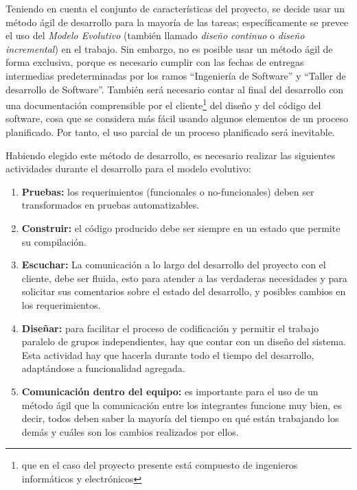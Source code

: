 \documentclass[letterpaper,spanish,10pt]{article}
\begin{document}

Teniendo en cuenta el conjunto de caracter\'isticas del proyecto, se
decide usar un m\'etodo \'agil de desarrollo para la
mayor\'ia de las tareas; espec\'ificamente se prevee el uso del \emph{Modelo
Evolutivo} (tambi\'en llamado \emph{dise\~no continuo} o \emph{dise\~no
incremental}) en el trabajo. Sin embargo, no es posible
usar un m\'etodo \'agil de forma exclusiva, porque es necesario cumplir con
las fechas de entregas intermedias predeterminadas por los ramos
``Ingenier\'ia de Software'' y ``Taller de desarrollo de Software''.
Tambi\'en ser\'a necesario contar al final del desarrollo con una
documentaci\'on comprensible por el cliente\footnote{que en el caso del
  proyecto presente est\'a compuesto de ingenieros inform\'aticos y
  electr\'onicos} del dise\~no y del c\'odigo del software, cosa que se
considera m\'as f\'acil usando algunos elementos de un proceso planificado.
Por
tanto, el uso parcial de un proceso planificado ser\'a inevitable.

Habiendo elegido este m\'etodo de desarrollo, es necesario realizar las
siguientes actividades durante el desarrollo para el modelo evolutivo:

\begin{enumerate}
\item \textbf{Pruebas:} los requerimientos (funcionales o no-funcionales) deben
  ser transformados en pruebas automatizables.
\item \textbf{Construir:} el c\'odigo producido debe ser siempre en un
  estado que permite su compilaci\'on.
\item \label{escuchar} \textbf{Escuchar:} La comunicaci\'on a lo largo del desarrollo del proyecto
con el cliente, debe ser fluida, esto para atender a las 
  verdaderas necesidades y para solicitar sus comentarios sobre el
  estado del desarrollo, y posibles cambios en los requerimientos.
\item \textbf{Dise\~nar:} para facilitar el proceso de codificaci\'on y permitir el
  trabajo paralelo de grupos independientes, hay que contar con un
  dise\~no del sistema.
  Esta actividad hay que hacerla durante todo el tiempo del desarrollo,
  adapt\'andose a funcionalidad agregada.
\item \label{comunicar} \textbf{Comunicaci\'on dentro del equipo:} es importante
  para el uso de un m\'etodo \'agil que la comunicaci\'on entre los integrantes funcione
  muy bien, es decir, todos deben saber la mayor\'ia del tiempo en qu\'e
  est\'an trabajando los dem\'as y cu\'ales son los cambios realizados por
  ellos.
\end{enumerate}
\end{document}
